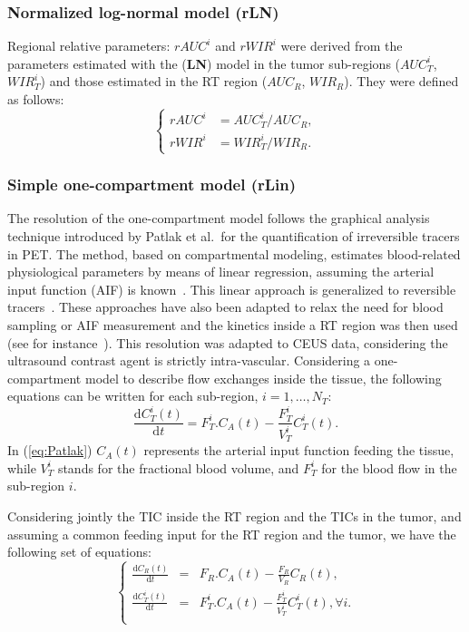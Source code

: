 \subsubsection{Normalized log-normal model (\textbf{rLN})} 
Regional relative parameters: $rAUC^i$ and $rWIR^i$ were derived from the parameters estimated with the (\textbf{LN}) model in the tumor sub-regions ($AUC_T^i$, $WIR_T^i$) and those estimated in the RT region ($AUC_R$, $WIR_R$). 
They were defined as follows:
\begin{equation}
\begin{cases} 
rAUC^i &= AUC_T^i/AUC_R,\\ 
rWIR^i &= WIR_T^i/WIR_R. 
\end{cases}
\end{equation}

\subsubsection{Simple one-compartment model (\textbf{rLin})} 
The resolution of the one-compartment model follows the graphical analysis technique introduced by Patlak et al.~for the quantification of irreversible tracers in PET. 
The method, based on compartmental modeling, estimates blood-related physiological parameters by means of linear regression, assuming the arterial input function (AIF) is known~\cite{Patlak:1983id}.
This linear approach is generalized to reversible tracers~\cite{Logan:1990jg}. 
These approaches have also been adapted to relax the need for blood sampling or AIF measurement and the kinetics inside a RT region was then used (see for instance~\cite{CardenasRodriguez:2013em}).
This resolution was adapted to CEUS data, considering the ultrasound contrast agent is strictly intra-vascular. Considering a one-compartment model to describe flow exchanges inside the tissue, the following equations can be written for each sub-region, $i = 1,\ldots,N_T$:
\begin{equation}
\frac{\mathrm dC_T^i\left(t\right)}{\mathrm dt} = F_T^i.C_A \left(t\right) - \frac{F_T^i}{V_T^i} C_T^i \left(t\right).
\label{eq:Patlak}
\end{equation}
In (\ref{eq:Patlak}) $C_A \left(t\right)$ represents the arterial input function feeding the tissue, while $V_T^i$ stands for the fractional blood volume, and $F_T^i$ for the blood flow in the sub-region $i$.

Considering jointly the TIC inside the RT region and the TICs in the tumor, and assuming a common feeding input for the RT region and the tumor, we have the following set of equations:
\begin{equation}
\left\{ \begin{array}{rcl}
\frac{\mathrm dC_R\left(t\right)}{\mathrm dt} &=& F_R.C_A \left(t\right) - \frac{F_R}{V_R} C_R \left(t\right),\\
\frac{\mathrm dC_T^i\left(t\right)}{\mathrm dt} &=& F_T^i.C_A \left(t\right) - \frac{F_T^i}{V_T^i} C_T^i \left(t\right), \forall i.\\
\end{array}\right.
\label{eq:rLin}
\end{equation}

